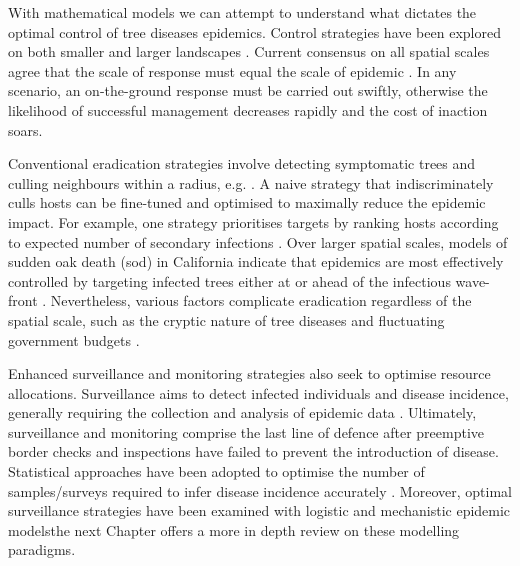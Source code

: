 With mathematical models we can attempt to understand what dictates the optimal control of tree diseases epidemics. 
Control strategies have been explored on both smaller \cite{risk-potential-control} 
and larger landscapes \cite{large-scale-control2}. Current consensus on all spatial scales
agree that the scale of response must equal the scale of epidemic \cite{control-scale-matching}. In any scenario, 
an on-the-ground response must be carried out swiftly, otherwise the likelihood of successful management decreases rapidly and the cost of inaction soars.

Conventional eradication strategies involve detecting symptomatic trees and culling neighbours within a radius, e.g. \cite{WEBIDEMICS}.
A naive strategy that indiscriminately culls hosts can be fine-tuned and optimised to maximally reduce the epidemic impact. 
For example, one strategy prioritises targets by ranking hosts according to expected number of secondary infections \cite{risk-potential-control}.
Over larger spatial scales, models of sudden oak death (\acrshort{sod}) in California indicate that epidemics are most effectively controlled by targeting infected trees either at or ahead of the infectious wave-front \cite{large-scale-control}.
Nevertheless, various factors complicate eradication regardless of the spatial scale, such as the cryptic nature of tree diseases and fluctuating government budgets \cite{control-theory, control-theory-application}.

Enhanced surveillance and monitoring strategies also seek to optimise resource allocations. 
Surveillance aims to detect infected individuals and disease incidence, generally requiring the collection and analysis of epidemic data \cite{surveillance-review}.
Ultimately, surveillance and monitoring comprise the last line of defence after preemptive border checks and inspections have failed to prevent the introduction of disease. 
Statistical approaches have been adopted to optimise the number of samples/surveys required to infer disease incidence accurately \cite{yamamura2016sampling}.
Moreover, optimal surveillance strategies have been examined with logistic \cite{parnell2012estimating} 
and mechanistic \cite{WEBIDEMICS} epidemic models\textemdash the next Chapter offers a more in depth review on these modelling paradigms.

